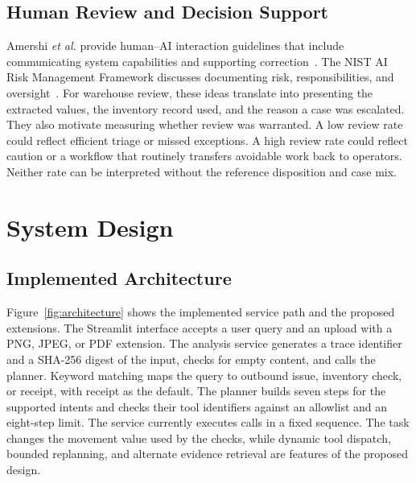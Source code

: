 \documentclass[conference]{IEEEtran}
\begin{document}
\subsection{Human Review and Decision Support}
Amershi \emph{et al.} provide human--AI interaction guidelines that include communicating system capabilities and supporting correction~\cite{amershi}. The NIST AI Risk Management Framework discusses documenting risk, responsibilities, and oversight~\cite{nist}. For warehouse review, these ideas translate into presenting the extracted values, the inventory record used, and the reason a case was escalated. They also motivate measuring whether review was warranted. A low review rate could reflect efficient triage or missed exceptions. A high review rate could reflect caution or a workflow that routinely transfers avoidable work back to operators. Neither rate can be interpreted without the reference disposition and case mix.

\section{System Design}
\subsection{Implemented Architecture}
Figure~\ref{fig:architecture} shows the implemented service path and the proposed extensions. The Streamlit interface accepts a user query and an upload with a PNG, JPEG, or PDF extension. The analysis service generates a trace identifier and a SHA-256 digest of the input, checks for empty content, and calls the planner. Keyword matching maps the query to outbound issue, inventory check, or receipt, with receipt as the default. The planner builds seven steps for the supported intents and checks their tool identifiers against an allowlist and an eight-step limit. The service currently executes calls in a fixed sequence. The task changes the movement value used by the checks, while dynamic tool dispatch, bounded replanning, and alternate evidence retrieval are features of the proposed design.
\end{document}
